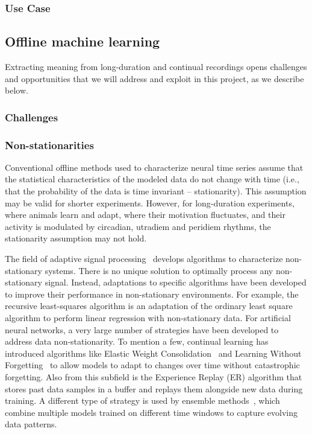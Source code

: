 \documentclass[12pt]{article}
\begin{document}
\subsubsection{Use Case}
\label{sec:useCase}

%
%
%

\subsection{Offline machine learning}

Extracting meaning from long-duration and continual recordings opens
challenges and opportunities that we will address and exploit in this project,
as we describe below.

\subsubsection{Challenges}

\subsubsection*{Non-stationarities}

Conventional offline methods used to characterize neural time series assume
that the statistical characteristics of the modeled data do not change with
time (i.e., that the probability of the data is time invariant --
stationarity). This assumption may be valid for shorter experiments. However,
for long-duration experiments, where animals learn and adapt, where their
motivation fluctuates, and their activity is modulated by circadian, utradiem
and peridiem rhythms, the stationarity assumption may not hold.

The field of adaptive signal processing~\citep{haykin02} develops algorithms to
characterize non-stationary systems. There is no unique solution to optimally
process any non-stationary signal. Instead, adaptations to specific algorithms
have been developed to improve their performance in non-stationary
environments.
%
For example, the recursive least-squares algorithm \citep[][Chapter
9]{haykin02} is an adaptation of the ordinary least square algorithm to perform
linear regression with non-stationary data.
%
For artificial neural networks, a very large number of strategies have been
developed to address data non-stationarity. To mention a few, continual
learning has introduced algorithms like  Elastic Weight
Consolidation~\citep[EWC][]{} and Learning Without Forgetting~\citep[LwF][]{}
to allow models to adapt to changes over time without catastrophic forgetting.
Also from this subfield is the Experience Replay (ER) algorithm that stores
past data samples in a buffer and replays them alongside new data during
training. A different type of strategy is used by ensemble methods~\citep{},
which combine multiple models trained on different time windows to capture
evolving data patterns.
\end{document}
